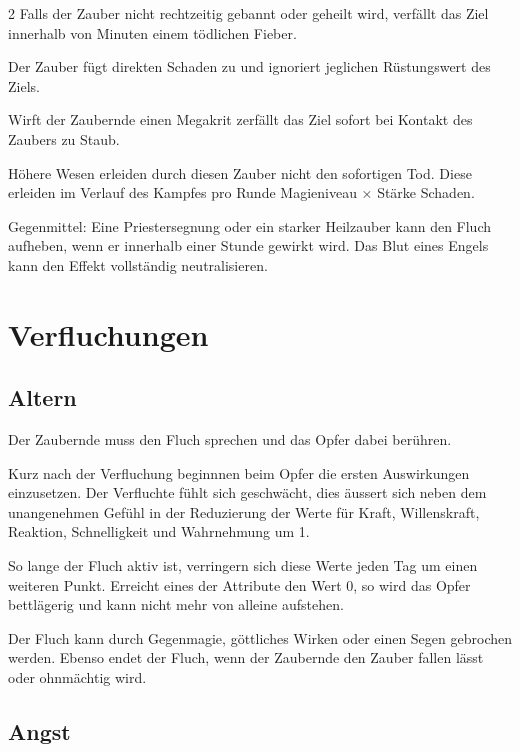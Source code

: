 \begin{multicols*}{2}
Falls der Zauber nicht rechtzeitig gebannt oder geheilt wird, verfällt das Ziel innerhalb von Minuten einem tödlichen Fieber.

Der Zauber fügt direkten Schaden zu und ignoriert jeglichen Rüstungswert des Ziels.

Wirft der Zaubernde einen Megakrit zerfällt das Ziel sofort bei Kontakt des Zaubers zu Staub.

Höhere Wesen erleiden durch diesen Zauber nicht den sofortigen Tod. Diese erleiden im Verlauf des Kampfes pro Runde Magieniveau × Stärke Schaden.

Gegenmittel: Eine Priestersegnung oder ein starker Heilzauber kann den Fluch aufheben, wenn er innerhalb einer Stunde gewirkt wird. Das Blut eines Engels kann den Effekt vollständig neutralisieren.



\section{Verfluchungen}

\subsection{Altern}

Der Zaubernde muss den Fluch sprechen und das Opfer dabei berühren.

Kurz nach der Verfluchung beginnnen beim Opfer die ersten Auswirkungen einzusetzen. Der Verfluchte fühlt sich geschwächt, dies äussert sich neben dem unangenehmen Gefühl in der Reduzierung der Werte für Kraft, Willenskraft, Reaktion, Schnelligkeit und Wahrnehmung um 1.

So lange der Fluch aktiv ist, verringern sich diese Werte jeden Tag um einen weiteren Punkt. Erreicht eines der Attribute den Wert 0, so wird das Opfer bettlägerig und kann nicht mehr von alleine aufstehen.

Der Fluch kann durch Gegenmagie, göttliches Wirken oder einen Segen gebrochen werden. Ebenso endet der Fluch, wenn der Zaubernde den Zauber fallen lässt oder ohnmächtig wird.



\subsection{Angst}


\end{multicols*}
